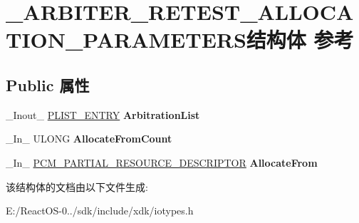 \hypertarget{struct___a_r_b_i_t_e_r___r_e_t_e_s_t___a_l_l_o_c_a_t_i_o_n___p_a_r_a_m_e_t_e_r_s}{}\section{\+\_\+\+A\+R\+B\+I\+T\+E\+R\+\_\+\+R\+E\+T\+E\+S\+T\+\_\+\+A\+L\+L\+O\+C\+A\+T\+I\+O\+N\+\_\+\+P\+A\+R\+A\+M\+E\+T\+E\+R\+S结构体 参考}
\label{struct___a_r_b_i_t_e_r___r_e_t_e_s_t___a_l_l_o_c_a_t_i_o_n___p_a_r_a_m_e_t_e_r_s}
\subsection*{Public 属性}
\begin{DoxyCompactItemize}
\item 
\mbox{\label{struct___a_r_b_i_t_e_r___r_e_t_e_s_t___a_l_l_o_c_a_t_i_o_n___p_a_r_a_m_e_t_e_r_s_aec07a3c382dd37501e3ed3732261a26c}} 
\+\_\+\+Inout\+\_\+ \hyperlink{struct___l_i_s_t___e_n_t_r_y}{P\+L\+I\+S\+T\+\_\+\+E\+N\+T\+RY} {\bfseries Arbitration\+List}
\item 
\mbox{\label{struct___a_r_b_i_t_e_r___r_e_t_e_s_t___a_l_l_o_c_a_t_i_o_n___p_a_r_a_m_e_t_e_r_s_afa7fc2abb54d2fe95a2fb6eb8e016855}} 
\+\_\+\+In\+\_\+ U\+L\+O\+NG {\bfseries Allocate\+From\+Count}
\item 
\mbox{\label{struct___a_r_b_i_t_e_r___r_e_t_e_s_t___a_l_l_o_c_a_t_i_o_n___p_a_r_a_m_e_t_e_r_s_a33892015145b503a04a1fe31c75753cb}} 
\+\_\+\+In\+\_\+ \hyperlink{struct___c_m___p_a_r_t_i_a_l___r_e_s_o_u_r_c_e___d_e_s_c_r_i_p_t_o_r}{P\+C\+M\+\_\+\+P\+A\+R\+T\+I\+A\+L\+\_\+\+R\+E\+S\+O\+U\+R\+C\+E\+\_\+\+D\+E\+S\+C\+R\+I\+P\+T\+OR} {\bfseries Allocate\+From}
\end{DoxyCompactItemize}


该结构体的文档由以下文件生成\+:\begin{DoxyCompactItemize}
\item 
E\+:/\+React\+O\+S-\/0../sdk/include/xdk/iotypes.\+h\end{DoxyCompactItemize}
